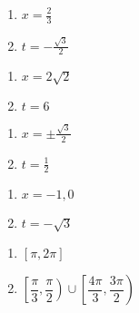 \documentclass{ximera}
\begin{document}
\begin{multicols}{2}
\begin{enumerate}
\setcounter{enumi}{\value{HW}}

\item $x = \frac{2}{3}$ 
\item $t=-\frac{\sqrt{3}}{2}$

\setcounter{HW}{\value{enumi}}
\end{enumerate}
\end{multicols}


\begin{multicols}{2}
\begin{enumerate}
\setcounter{enumi}{\value{HW}}

\item  $x = 2\sqrt{2}$
\item  $t = 6$

\setcounter{HW}{\value{enumi}}
\end{enumerate}
\end{multicols}

\begin{multicols}{2}
\begin{enumerate}
\setcounter{enumi}{\value{HW}}

\item $x = \pm \frac{\sqrt{3}}{2}$
\item $t = \frac{1}{2}$ 

\setcounter{HW}{\value{enumi}}
\end{enumerate}
\end{multicols}

\begin{multicols}{2}
\begin{enumerate}
\setcounter{enumi}{\value{HW}}

\item $x = -1,0$
\item $t = -\sqrt{3}$

\setcounter{HW}{\value{enumi}}
\end{enumerate}
\end{multicols}

\begin{multicols}{2}

\begin{enumerate}

\setcounter{enumi}{\value{HW}}

\item $\left[ \pi, 2\pi \right]$ 
\item $\left[ \dfrac{\pi}{3}, \dfrac{\pi}{2} \right) \cup \left[ \dfrac{4\pi}{3}, \dfrac{3\pi}{2} \right)$

\setcounter{HW}{\value{enumi}}

\end{enumerate}

\end{multicols}
\end{document}
